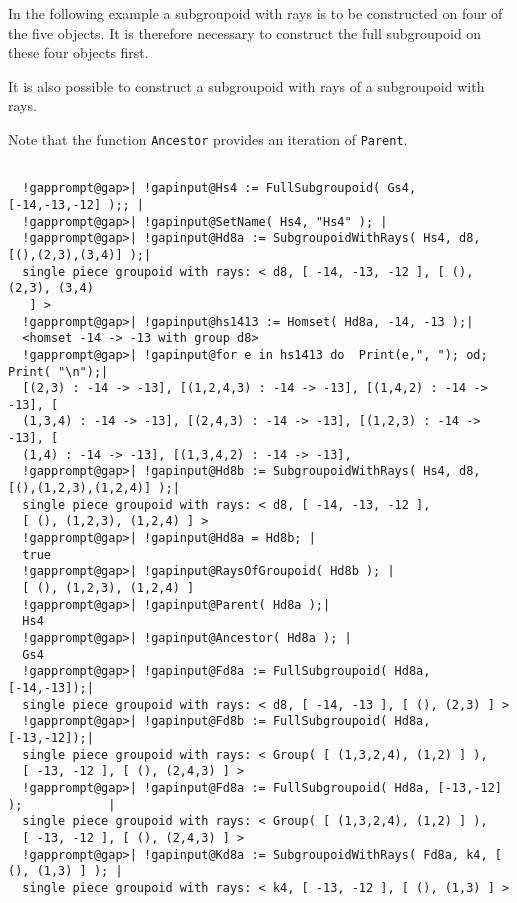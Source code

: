 \documentclass[a4paper,11pt]{report}
\begin{document}
{{{ In the following example a subgroupoid with rays is to be constructed on four
of the five objects. It is therefore necessary to construct the full
subgroupoid on these four objects first. 

 It is also possible to construct a subgroupoid with rays of a subgroupoid with
rays. 

 Note that the function  \texttt{Ancestor} provides an iteration of \texttt{Parent}. 

 }

 
\begin{Verbatim}[commandchars=!@|,fontsize=\small,frame=single,label=Example]
  
  !gapprompt@gap>| !gapinput@Hs4 := FullSubgroupoid( Gs4, [-14,-13,-12] );; |
  !gapprompt@gap>| !gapinput@SetName( Hs4, "Hs4" ); |
  !gapprompt@gap>| !gapinput@Hd8a := SubgroupoidWithRays( Hs4, d8, [(),(2,3),(3,4)] );|
  single piece groupoid with rays: < d8, [ -14, -13, -12 ], [ (), (2,3), (3,4)
   ] >
  !gapprompt@gap>| !gapinput@hs1413 := Homset( Hd8a, -14, -13 );|
  <homset -14 -> -13 with group d8>
  !gapprompt@gap>| !gapinput@for e in hs1413 do  Print(e,", "); od;  Print( "\n");|
  [(2,3) : -14 -> -13], [(1,2,4,3) : -14 -> -13], [(1,4,2) : -14 -> -13], [
  (1,3,4) : -14 -> -13], [(2,4,3) : -14 -> -13], [(1,2,3) : -14 -> -13], [
  (1,4) : -14 -> -13], [(1,3,4,2) : -14 -> -13], 
  !gapprompt@gap>| !gapinput@Hd8b := SubgroupoidWithRays( Hs4, d8, [(),(1,2,3),(1,2,4)] );|
  single piece groupoid with rays: < d8, [ -14, -13, -12 ],
  [ (), (1,2,3), (1,2,4) ] >
  !gapprompt@gap>| !gapinput@Hd8a = Hd8b; |
  true
  !gapprompt@gap>| !gapinput@RaysOfGroupoid( Hd8b ); |
  [ (), (1,2,3), (1,2,4) ]
  !gapprompt@gap>| !gapinput@Parent( Hd8a );|
  Hs4
  !gapprompt@gap>| !gapinput@Ancestor( Hd8a ); |
  Gs4
  !gapprompt@gap>| !gapinput@Fd8a := FullSubgroupoid( Hd8a, [-14,-13]);|
  single piece groupoid with rays: < d8, [ -14, -13 ], [ (), (2,3) ] >
  !gapprompt@gap>| !gapinput@Fd8b := FullSubgroupoid( Hd8a, [-13,-12]);|
  single piece groupoid with rays: < Group( [ (1,3,2,4), (1,2) ] ), 
  [ -13, -12 ], [ (), (2,4,3) ] >
  !gapprompt@gap>| !gapinput@Fd8a := FullSubgroupoid( Hd8a, [-13,-12] );            |
  single piece groupoid with rays: < Group( [ (1,3,2,4), (1,2) ] ), 
  [ -13, -12 ], [ (), (2,4,3) ] >
  !gapprompt@gap>| !gapinput@Kd8a := SubgroupoidWithRays( Fd8a, k4, [ (), (1,3) ] ); |
  single piece groupoid with rays: < k4, [ -13, -12 ], [ (), (1,3) ] >
  
\end{Verbatim}
 }

}
\end{document}
